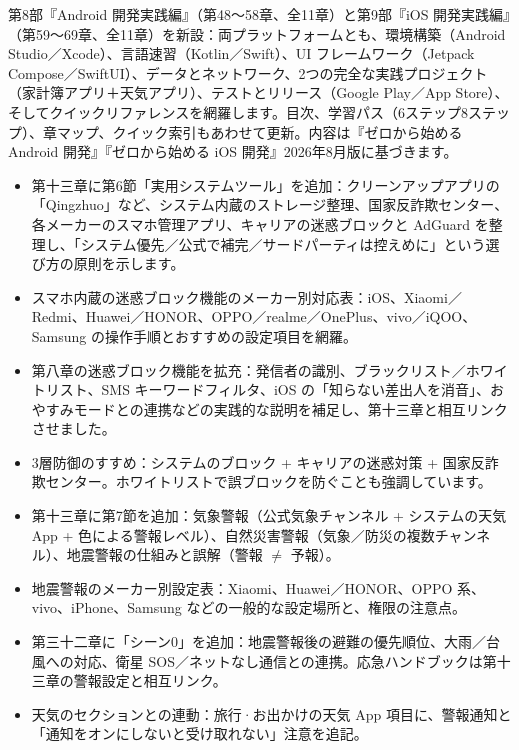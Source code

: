 第8部『Android 開発実践編』（第48〜58章、全11章）と第9部『iOS 開発実践編』（第59〜69章、全11章）を新設：両プラットフォームとも、環境構築（Android Studio／Xcode）、言語速習（Kotlin／Swift）、UI フレームワーク（Jetpack Compose／SwiftUI）、データとネットワーク、2つの完全な実践プロジェクト（家計簿アプリ＋天気アプリ）、テストとリリース（Google Play／App Store）、そしてクイックリファレンスを網羅します。目次、学習パス（6ステップ8ステップ）、章マップ、クイック索引もあわせて更新。内容は『ゼロから始める Android 開発』『ゼロから始める iOS 開発』2026年8月版に基づきます。


\begin{itemize}
  \item 第十三章に第6節「実用システムツール」を追加：クリーンアップアプリの「Qingzhuo」など、システム内蔵のストレージ整理、国家反詐欺センター、各メーカーのスマホ管理アプリ、キャリアの迷惑ブロックと AdGuard を整理し、「システム優先／公式で補完／サードパーティは控えめに」という選び方の原則を示します。
  \item スマホ内蔵の迷惑ブロック機能のメーカー別対応表：iOS、Xiaomi／Redmi、Huawei／HONOR、OPPO／realme／OnePlus、vivo／iQOO、Samsung の操作手順とおすすめの設定項目を網羅。
  \item 第八章の迷惑ブロック機能を拡充：発信者の識別、ブラックリスト／ホワイトリスト、SMS キーワードフィルタ、iOS の「知らない差出人を消音」、おやすみモードとの連携などの実践的な説明を補足し、第十三章と相互リンクさせました。
  \item 3層防御のすすめ：システムのブロック + キャリアの迷惑対策 + 国家反詐欺センター。ホワイトリストで誤ブロックを防ぐことも強調しています。
\end{itemize}


\begin{itemize}
  \item 第十三章に第7節を追加：気象警報（公式気象チャンネル + システムの天気 App + 色による警報レベル）、自然災害警報（気象／防災の複数チャンネル）、地震警報の仕組みと誤解（警報 $\neq$ 予報）。
  \item 地震警報のメーカー別設定表：Xiaomi、Huawei／HONOR、OPPO 系、vivo、iPhone、Samsung などの一般的な設定場所と、権限の注意点。
  \item 第三十二章に「シーン0」を追加：地震警報後の避難の優先順位、大雨／台風への対応、衛星 SOS／ネットなし通信との連携。応急ハンドブックは第十三章の警報設定と相互リンク。
  \item 天気のセクションとの連動：旅行·お出かけの天気 App 項目に、警報通知と「通知をオンにしないと受け取れない」注意を追記。
\end{itemize}

